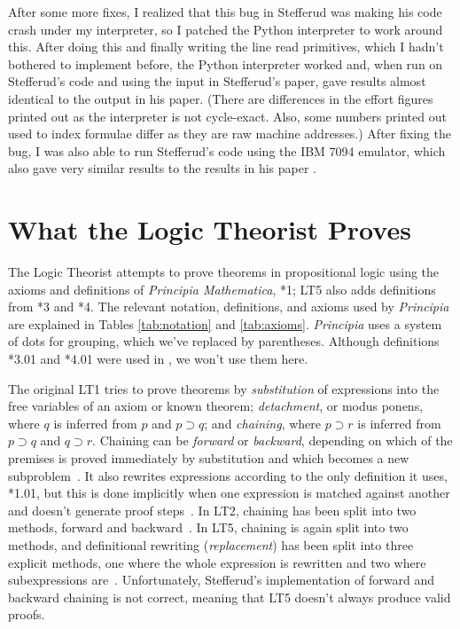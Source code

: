 \documentclass[journal]{IEEEtran}
\begin{document}
After some more fixes, I realized that
this bug in Stefferud was making his code crash under my
interpreter, so
I patched the Python interpreter to work around this.
After doing this and finally writing the line read primitives,
which I hadn't bothered to implement before, the Python interpreter
worked and, when run on Stefferud's code and using the input in Stefferud's
paper, gave results almost identical to the output in his paper.
(There are differences in the effort figures printed out as the
interpreter is not cycle-exact.  Also, some numbers printed out
used to index formulae differ as they are raw machine addresses.)
After fixing the bug, I was also able to run Stefferud's code using
the IBM 7094 emulator, which also gave very similar results to the
results in his paper \cite{moewsrepo2}.

%
% 

\section{What the Logic Theorist Proves}
\label{sec:results}

The Logic Theorist attempts to prove theorems in propositional logic
using the axioms and definitions of \textit{Principia Mathematica}, 
*1; LT5 also adds definitions from *3 and 
*4.  The relevant notation, definitions, and axioms used by \textit{Principia}
are explained in Tables \ref{tab:notation} and \ref{tab:axioms}.
{\em Principia} uses a system of dots for grouping, which we've
replaced by parentheses.
Although definitions *3.01 and *4.01 were used in \cite{stefferud1963lt},
we won't use them here.

The original LT1 tries to prove theorems by {\em substitution}
of expressions into the free variables of an axiom or known
theorem; {\em detachment}, or modus ponens, where $q$ is inferred
from $p$ and $p\supset q$; and {\em chaining}, where $p\supset r$
is inferred from $p\supset q$ and $q\supset r$.  Chaining can
be {\em forward} or {\em backward}, depending on which of the
premises is proved immediately by substitution and which becomes
a new subproblem~\cite[pp.~29--45]{LT1956b}.
It also rewrites expressions according to the only definition
it uses, *1.01, but this is done implicitly when one expression
is matched against another and doesn't generate proof 
steps~\cite[p.~34]{LT1956b}.
In LT2, chaining has been split into two methods, forward
and backward~\cite[p.~222]{LT1957}.
In LT5, chaining is again split into two methods,
and definitional rewriting ({\em replacement})
has been split into three explicit methods, one where the whole
expression is rewritten and two where subexpressions 
are~\cite[Section~III]{stefferud1963lt}.
Unfortunately, Stefferud's implementation of forward and
backward chaining is not correct, meaning that LT5 doesn't
always produce valid proofs.
\end{document}
